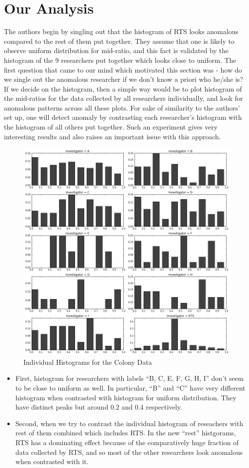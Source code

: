 \documentclass{article}
\begin{document}
    \section{Our Analysis}\label{our-analysis}

    The authors begin by singling out that the histogram of RTS looks anomalous
compared to the rest of them put together. They assume that one is
likely to observe uniform distribution for mid-ratio, and this fact is
validated by the histogram of the 9 researchers put together which looks
close to uniform. The first question that came to our mind which motivated this section was - how do we single out the
anomalous researcher if we don't know a priori who he/she is? If we decide on the histogram, then a simple
way would be to plot histogram of the mid-ratios for the data
collected by all researchers individually, and look for anomalous patterns
across all these plots. For sake of similarity to the authors' set up,
one will detect anomaly by contrasting each researcher's histogram with
the histogram of all others put together. Such an experiment gives very
interesting results and also raises an important issue with this
approach.
\begin{figure}[H]
\centering
\includegraphics[width=0.8\linewidth]{images/new_mid_ratio.png}
\caption{Individual Histograms for the Colony Data}
\end{figure}

\begin{itemize}
\item
  First, histogram for researchers with labels ``B, C, E, F, G, H, I'' don't
  seem to be close to uniform as well. In particular, ``B'' and ``C''
  have very different histogram when contrasted with histogram for
  uniform distribution. They have distinct peaks but around 0.2 and 0.4
  respectively.
\item
  Second, when we try to contrast the individual histogram of reseachers
  with rest of them combined which includes RTS. In the new ``rest''
  histgorams, RTS has a dominating effect because of the comparatively
  huge fraction of data collected by RTS, and so most of the other
  researchers look anomalous when contrasted with it.
\end{itemize}
\end{document}
